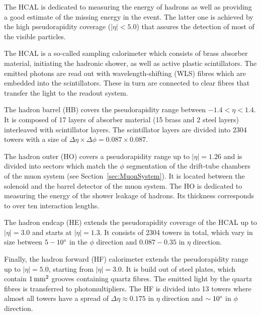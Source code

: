 The HCAL is dedicated to measuring the energy of hadrons as well as providing a good estimate of the missing energy in the event.
The latter one is achieved by the high pseudorapidity coverage ($|\eta|<5.0$) that assures the detection of most of the visible particles.

The HCAL is a so-called sampling calorimeter which consists of brass absorber material, initiating the hadronic shower, as well as active plastic scintillators.
The emitted photons are read out with wavelength-shifting (WLS) fibres which are embedded into the scintillators.
These in turn are connected to clear fibres that transfer the light to the readout system.

The hadron barrel (HB) covers the pseudorapidity range between $-1.4 < \eta < 1.4$.
It is composed of 17 layers of absorber material (15 brass and 2 steel layers) interleaved with scintillator layers.
The scintillator layers are divided into 2304 towers with a size of $\Delta \eta \times \Delta \phi = 0.087 \times 0.087$.

The hadron outer (HO) covers a pseudorapidity range up to $|\eta|=1.26$ and is divided into sectors which match the $\phi$ segmentation of the drift-tube chambers of the muon system (see Section~\ref{sec:MuonSystem}).
It is located between the solenoid and the barrel detector of the muon system.
The HO is dedicated to measuring the energy of the shower leakage of hadrons.
Its thickness corresponds to over ten interaction lengths.

The hadron endcap (HE) extends the pseudorapidity coverage of the HCAL up to $|\eta|=3.0$ and starts at $|\eta|=1.3$.
It consists of 2304 towers in total, which vary in size between $5-10\degree$ in the $\phi$ direction and $0.087-0.35$ in $\eta$ direction.

Finally, the hadron forward (HF) calorimeter extends the pseudorapidity range up to $|\eta|=5.0$, starting from $|\eta|=3.0$.
It is build out of steel plates, which contain $1\,\text{mm}^2$ grooves containing quartz fibres.
The emitted light by the quartz fibres is transferred to photomultipliers.
The HF is divided into 13 towers where almost all towers have a spread of $\Delta \eta \approx 0.175$ in $\eta$ direction and $\sim 10\degree$ in $\phi$ direction.
 
